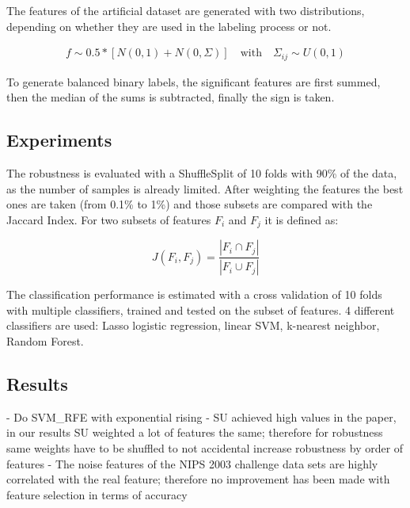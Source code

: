 \documentclass[twoside,11pt]{article}
\begin{document}
{The features of the artificial dataset are generated with two distributions, depending on whether they are used in the labeling process or not.

\begin{align}
f \sim0.5 * \left[ N(0, 1) + N(0, \Sigma) \right]  \quad \text{with} \quad \Sigma_{ij} \sim U(0,1)
\end{align}

To generate balanced binary labels, the significant features are first summed, then the median of the sums is subtracted, finally the sign is taken. 





\subsection{Experiments}

The robustness is evaluated with a ShuffleSplit of 10 folds with 90\% of the data, as the number of samples is already limited. After weighting the features the best ones are taken (from 0.1\% to 1\%) and those subsets are compared with the Jaccard Index. For two subsets of features $F_i$ and $F_j$ it is defined as:

\begin{equation}
J(F_i, F_j) = \frac{| F_i \cap F_j |}{| F_i \cup F_j |}
\end{equation}

The classification performance is estimated with a cross validation of 10 folds with multiple classifiers, trained and tested on the subset of features. 4 different classifiers are used: Lasso logistic regression, linear SVM, k-nearest neighbor, Random Forest.

\subsection{Results}
- Do SVM\_RFE with exponential rising
- SU achieved high values in the paper, in our results SU weighted a lot of features the 
same; therefore for robustness same weights have to be shuffled to not accidental increase
robustness by order of features
- The noise features of the NIPS 2003 challenge data sets are highly correlated with the
real feature; therefore no improvement has been made with feature selection in terms of 
accuracy

}
\end{document}
